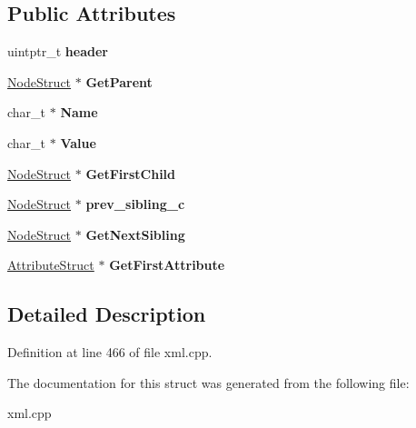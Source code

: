 \subsection*{Public Attributes}
\begin{DoxyCompactItemize}
\item 
\hypertarget{structphys_1_1xml_1_1NodeStruct_a68ff269f03bdab91cbeb96174d4df3a8}{
uintptr\_\-t {\bfseries header}}
\label{d7/dd5/structphys_1_1xml_1_1NodeStruct_a68ff269f03bdab91cbeb96174d4df3a8}

\item 
\hypertarget{structphys_1_1xml_1_1NodeStruct_a18b9637a936d402699a28f37866140b8}{
\hyperlink{structphys_1_1xml_1_1NodeStruct}{NodeStruct} $\ast$ {\bfseries GetParent}}
\label{d7/dd5/structphys_1_1xml_1_1NodeStruct_a18b9637a936d402699a28f37866140b8}

\item 
\hypertarget{structphys_1_1xml_1_1NodeStruct_ab27d7b1bf921844a9af1f4083f59f198}{
char\_\-t $\ast$ {\bfseries Name}}
\label{d7/dd5/structphys_1_1xml_1_1NodeStruct_ab27d7b1bf921844a9af1f4083f59f198}

\item 
\hypertarget{structphys_1_1xml_1_1NodeStruct_a183475da096134672af3de253b2cc4c3}{
char\_\-t $\ast$ {\bfseries Value}}
\label{d7/dd5/structphys_1_1xml_1_1NodeStruct_a183475da096134672af3de253b2cc4c3}

\item 
\hypertarget{structphys_1_1xml_1_1NodeStruct_a7c4d79e29adf579924ab9ec61107166e}{
\hyperlink{structphys_1_1xml_1_1NodeStruct}{NodeStruct} $\ast$ {\bfseries GetFirstChild}}
\label{d7/dd5/structphys_1_1xml_1_1NodeStruct_a7c4d79e29adf579924ab9ec61107166e}

\item 
\hypertarget{structphys_1_1xml_1_1NodeStruct_ab803e620f77fc53cdbb313702e9de966}{
\hyperlink{structphys_1_1xml_1_1NodeStruct}{NodeStruct} $\ast$ {\bfseries prev\_\-sibling\_\-c}}
\label{d7/dd5/structphys_1_1xml_1_1NodeStruct_ab803e620f77fc53cdbb313702e9de966}

\item 
\hypertarget{structphys_1_1xml_1_1NodeStruct_abc3a431a752cfb55f5f5fbae57e14f54}{
\hyperlink{structphys_1_1xml_1_1NodeStruct}{NodeStruct} $\ast$ {\bfseries GetNextSibling}}
\label{d7/dd5/structphys_1_1xml_1_1NodeStruct_abc3a431a752cfb55f5f5fbae57e14f54}

\item 
\hypertarget{structphys_1_1xml_1_1NodeStruct_a4e0cb6f144b810d52dc3506cc1e65785}{
\hyperlink{structphys_1_1xml_1_1AttributeStruct}{AttributeStruct} $\ast$ {\bfseries GetFirstAttribute}}
\label{d7/dd5/structphys_1_1xml_1_1NodeStruct_a4e0cb6f144b810d52dc3506cc1e65785}

\end{DoxyCompactItemize}


\subsection{Detailed Description}


Definition at line 466 of file xml.cpp.



The documentation for this struct was generated from the following file:\begin{DoxyCompactItemize}
\item 
xml.cpp\end{DoxyCompactItemize}
